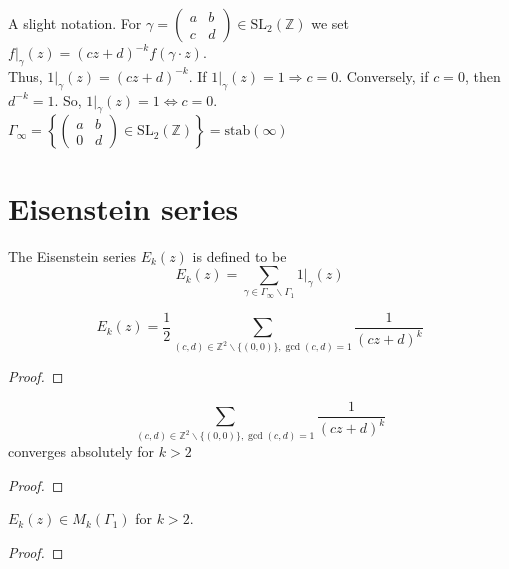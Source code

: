 \documentclass[oneside, 12pt]{scrbook}
\newcommand{\ZZ}{\mathbb Z}
\theoremstyle{theorem}
\begin{document}
A slight notation. For $\gamma  = \begin{pmatrix}
a & b \\ c & d
\end{pmatrix} \in \mathrm{SL}_{2} (\ZZ)$ we set $f|_{\gamma} (z) = (cz+d)^{-k}f(\gamma \cdot z)$. \\
Thus, $1|_{\gamma}(z) = (cz+d)^{-k}$. If $1|_{\gamma}(z) =1 \Rightarrow c =0$. Conversely, if $c=0$, then $d^{-k}=1$. So, $1|_{\gamma}(z)=1 \Leftrightarrow c=0$. \\
$\Gamma_{\infty} = \left\{ \begin{pmatrix}
a & b \\ 0 & d 
\end{pmatrix} \in \mathrm{SL}_{2}(\ZZ) \right\} = \mathrm{stab}(\infty)$

\section{Eisenstein series}

\begin{definition}
The Eisenstein series $E_{k}(z)$ is defined to be $$E_{k}(z) = \sum_{\gamma \in \Gamma_{\infty} \backslash \Gamma_{1}} 1|_{\gamma}(z)$$
\end{definition}

\begin{proposition}
$$E_{k}(z) = \frac{1}{2} \sum_{(c,d) \in \ZZ^{2} \backslash \{(0,0)\}, \gcd(c,d)=1} \frac{1}{(cz+d)^k}$$
\end{proposition}

\begin{proof}

\end{proof}

\begin{proposition}
$$\sum_{(c,d) \in \ZZ^{2} \backslash \{(0,0)\}, \gcd(c,d)=1} \frac{1}{(cz+d)^k}$$ converges absolutely for $k>2$
\end{proposition}

\begin{proof}

\end{proof}

\begin{theorem}
$E_{k}(z) \in M_{k}(\Gamma_{1})$ for $k >2$.
\end{theorem}

\begin{proof}

\end{proof}
\end{document}
